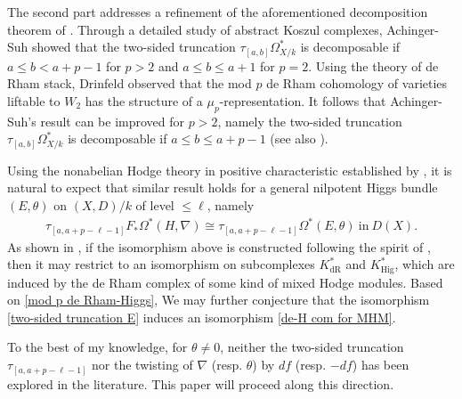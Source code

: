 \documentclass[12pt, a4paper]{article}
\begin{document}
The second part addresses a refinement of the aforementioned decomposition theorem of \cite[Th\'eorème 2.1]{DI}. Through a detailed study of abstract Koszul complexes, Achinger-Suh \cite[Theorem 1.1]{AS} showed that the two-sided truncation $\tau_{[a,b]}\Omega^*_{X/k}$ is decomposable if $a\leq b<a+p-1$ for $p>2$ and $a\leq b\leq a+1$ for $p=2$. Using the theory of de Rham stack, Drinfeld observed that the mod $p$ de Rham
cohomology of varieties liftable to $W_2$ has the structure of a $\mu_p$-representation. It follows that Achinger-Suh's result can be improved for $p>2$, namely the two-sided truncation $\tau_{[a,b]}\Omega^*_{X/k}$ is decomposable if $a\leq b\leq a+p-1$ (see also \cite{BL, LM, O24}).

Using the nonabelian Hodge theory in positive characteristic established by \cite{OV, Schepler}, it is natural to expect that similar result holds for a general nilpotent Higgs bundle $(E,\theta)$ on $(X,D)/k$ of level $\leq\ell$, namely
\begin{eqnarray}\label{two-sided truncation E}
\tau_{[a,a+p-\ell-1]}F_*\Omega^*(H,\nabla)\cong\tau_{[a,a+p-\ell-1]}\Omega^*(E,\theta)~\mathrm{in}~D(X).
\end{eqnarray}
As shown in \cite[\S3]{SZ2}, if the isomorphism above is constructed following the spirit of \cite{DI}, then it may restrict to an isomorphism on subcomplexes $K^*_\mathrm{dR}$ and $K^*_\mathrm{Hig}$, which are induced by the de Rham complex of some kind of mixed Hodge modules.
Based on \eqref{mod p de Rham-Higgs}, We may further conjecture that the isomorphism \eqref{two-sided truncation E} induces an isomorphism \eqref{de-H com for MHM}.

To the best of my knowledge, for $\theta\neq0$, neither the two-sided truncation $\tau_{[a,a+p-\ell-1]}$ nor the twisting of $\nabla$ (resp. $\theta$) by $df$ (resp. $-df$) has been explored in the literature. This paper will proceed along this direction.\fi

\end{document}
